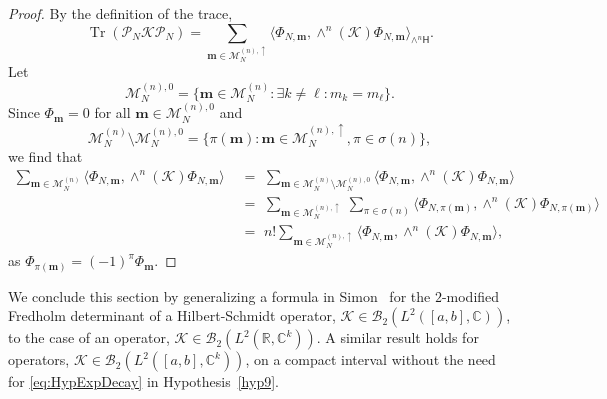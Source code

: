 \documentclass{birkjour}
\theoremstyle{definition}
\theoremstyle{remark}
\numberwithin{equation}{section}
\newcommand{\cB}{{\mathcal B}}
\begin{document}
\begin{proof} 
By the definition of the trace, 
\begin{equation}\label{trphiequality}
    \operatorname{Tr}(\mathcal{P}_N \mathcal{K} \mathcal{P}_N) = \!\!\! \sum_{\mathbf{m} \in \mathcal{M}_N^{(n), \uparrow}} \langle \Phi_{N,\mathbf{m}}, \wedge^n( \mathcal{K}) \Phi_{N,\mathbf{m}} \rangle_{\wedge^n\textsf{H}}.
\end{equation}
Let 
 \begin{equation}
     \mathcal{M}_N^{(n),0} = \{\mathbf{m} \in \mathcal{M}_N^{(n)} : \exists k \neq \ell : m_k = m_{\ell}\}.
 \end{equation}
Since $\Phi_{\mathbf{m}} = 0$ for all $\mathbf{m} \in\mathcal{M}_N^{(n),0} $ and
 \begin{equation}
     \mathcal{M}_N^{(n)} \setminus  \mathcal{M}_N^{(n),0} = \{\pi(\mathbf{m}) : \mathbf{m} \in \mathcal{M}_N^{(n), \uparrow}, \pi \in \sigma(n)\},
 \end{equation}
 we find that
 \begin{align}
     \sum_{\mathbf{m} \in \mathcal{M}_N^{(n)}} \langle \Phi_{N,\mathbf{m}}, {\wedge}^n (\mathcal{K}) \Phi_{N,\mathbf{m}} \rangle 
     &\,\,=\,\, \sum_{\mathbf{m} \in \mathcal{M}_N^{(n)} \setminus \mathcal{M}_N^{(n),0}} \langle \Phi_{N,\mathbf{m}}, {\wedge}^n (\mathcal{K}) \Phi_{N,\mathbf{m}} \rangle
     \nonumber
     \\
     &\,\,=\,\, \sum_{\mathbf{m} \in \mathcal{M}_N^{(n), \uparrow}} \, \sum_{\pi \in \sigma(n)} \langle \Phi_{N, \pi(\mathbf{m})}, {\wedge}^n (\mathcal{K}) \Phi_{N,\pi(\mathbf{m})} \rangle
    \nonumber
     \\
&\,\,=\,\, n! \sum_{\mathbf{m} \in \mathcal{M}_N^{(n),\uparrow}} \langle \Phi_{N, \mathbf{m}}, {\wedge}^n (\mathcal{K}) \Phi_{N, \mathbf{m}} \rangle,
 \end{align}
 as
$     \Phi_{ \pi(\mathbf{m})} = (-1)^{\pi} \Phi_{ \mathbf{m}}$.
  \end{proof} 
 
We conclude this section by generalizing a formula in Simon~\cite{Simon} for the 
$2$-modified Fredholm determinant of  a Hilbert-Schmidt operator, 
$\mathcal{K} \in \cB_2(L^2([a,b],\mathbb{C}))$, to the case of an operator, $\mathcal{K} \in \cB_2(L^2(\mathbb{R},\mathbb{C}^k))$. 
A similar result holds for operators,  
$\mathcal{K} \in \cB_2(L^2([a,b],\mathbb{C}^k))$, on a compact interval
without the need for \eqref{eq:HypExpDecay} in Hypothesis~\ref{hyp9}.
\end{document}
